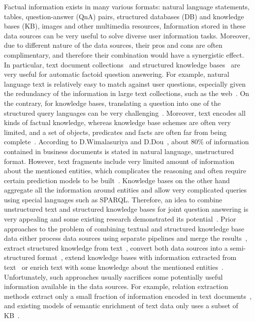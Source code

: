 Factual information exists in many various formats: natural language statements, tables, question-answer (QnA) pairs, structured databases (DB) and knowledge bases (KB), images and other multimedia resources, \etc
Information stored in these data sources can be very useful to solve diverse user information tasks.
Moreover, due to different nature of the data sources, their pros and cons are often complimentary, and therefore their combination would have a synergistic effect.
In particular, text document collections~\cite{Kolomiyets:2011:SQA:2046840.2047162} and structured knowledge bases~\cite{unger2014introduction} are very useful for automatic factoid question answering.
For example, natural language text is relatively easy to match against user questions, especially given the redundancy of the information in large text collections, such as the web~\cite{lin2007exploration}.
On the contrary, for knowledge bases, translating a question into one of the structured query languages can be very challenging~\cite{BerantCFL13:sempre}.
Moreover, text encodes all kinds of factual knowledge, whereas knowledge base schemes are often very limited, and a set of objects, predicates and facts are often far from being complete~\cite{Dong:2014:KVW:2623330.2623623}.
According to D.Wimalasuriya and D.Dou~\cite{wimalasuriya2010ontology}, about 80\% of information contained in business documents is stated in natural language, \ie unstructured format.
However, text fragments include very limited amount of information about the mentioned entities, which complicates the reasoning and often require certain prediction models to be built~\cite{LiRoth02}.
Knowledge bases on the other hand aggregate all the information around entities and allow very complicated queries using special languages such as SPARQL.
Therefore, an idea to combine unstructured text and structured knowledge bases for joint question answering is very appealing and some existing research demonstrated its potential~\cite{elbassuoni2009language,fader2013paraphrase,ferrucci2010building,Sun:2015:ODQ:2736277.2741651,baudivs2015yodaqa}.
Prior approaches to the problem of combining textual and structured knowledge base data either process data sources using separate pipelines and merge the results~\cite{ferrucci2010building,baudivs2015yodaqa}, extract structured knowledge from text~\cite{Agichtein:2000:SER:336597.336644,MintzBSJ09,Dong:2014:KVW:2623330.2623623}, convert both data sources into a semi-structured format~\cite{Fader:2014:OQA:2623330.2623677}, extend knowledge bases with information extracted from text~\cite{elbassuoni2009language,yahya2016question} or 
enrich text with some knowledge about the mentioned entities~\cite{Sun:2015:ODQ:2736277.2741651}.
Unfortunately, such approaches usually sacrifices some potentially useful information available in the data sources.
For example, relation extraction methods extract only a small fraction of information encoded in text documents~\cite{Dong:2014:KVW:2623330.2623623}, and existing models of semantic enrichment of text data only uses a subset of KB~\cite{Sun:2015:ODQ:2736277.2741651}.

